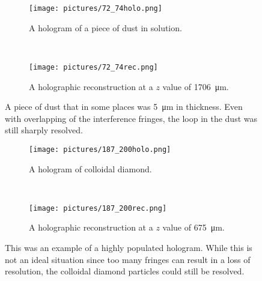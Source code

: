 \begin{figure}[ht!]
    \begin{center}

        \begin{subfigure}[t]{0.4\textwidth}
            \label{fig:72_74holo}
            \texttt{[image: pictures/72\_74holo.png]}
            \caption{A hologram of a piece of dust in solution.}
        \end{subfigure}
        \\
        \begin{subfigure}[t]{\textwidth}
            \label{fig:72_74rec}
            \texttt{[image: pictures/72\_74rec.png]}
            \caption{A holographic reconstruction at a $z$ value of
                \SI{1706}{\micro\meter}.}
        \end{subfigure}


    \end{center}
    \caption{%
        A piece of dust that in some places was \SI{5}{\micro\meter} in
        thickness. Even with overlapping of the interference fringes, the loop in the
        dust was still sharply resolved.
    }%
    \label{fig:72_74}
\end{figure}


\clearpage


\begin{figure}[ht!]
    \begin{center}

        \begin{subfigure}[t]{0.4\textwidth}
            \label{fig:187_200holo}
            \texttt{[image: pictures/187\_200holo.png]}
            \caption{A hologram of colloidal diamond.}
        \end{subfigure}
        \\
        \begin{subfigure}[t]{\textwidth}
            \label{fig:187_200rec}
            \texttt{[image: pictures/187\_200rec.png]}
            \caption{A holographic reconstruction at a $z$ value of \SI{675}{\micro\meter}.}
        \end{subfigure}


    \end{center}
    \caption{%
        This was an example of a highly populated hologram. While this is not
        an ideal situation since too many fringes can result in a loss of
        resolution, the colloidal diamond particles could still be
        resolved.
    }%
    \label{fig:187_200}
\end{figure}

